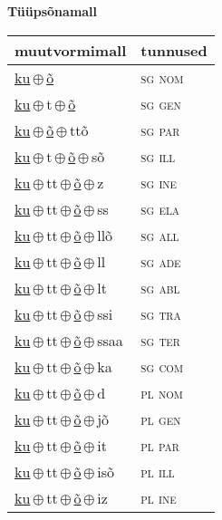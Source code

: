 

\vspace{3.5em}
\noindent \begin{minipage}{\textwidth}
\noindent \textbf{Tüüpsõnamall \,}\\

\begin{sideways}
\begin{tabular}{l l}
muutvormimall & tunnused \\
\hline
\underline{ku}\,$\oplus$\,\underline{õ} & \textsc{ sg nom } \\
\underline{ku}\,$\oplus$\,t\,$\oplus$\,\underline{õ} & \textsc{ sg gen } \\
\underline{ku}\,$\oplus$\,\underline{õ}\,$\oplus$\,ttõ & \textsc{ sg par } \\
\underline{ku}\,$\oplus$\,t\,$\oplus$\,\underline{õ}\,$\oplus$\,sõ & \textsc{ sg ill } \\
\underline{ku}\,$\oplus$\,tt\,$\oplus$\,\underline{õ}\,$\oplus$\,z & \textsc{ sg ine } \\
\underline{ku}\,$\oplus$\,tt\,$\oplus$\,\underline{õ}\,$\oplus$\,ss & \textsc{ sg ela } \\
\underline{ku}\,$\oplus$\,tt\,$\oplus$\,\underline{õ}\,$\oplus$\,llõ & \textsc{ sg all } \\
\underline{ku}\,$\oplus$\,tt\,$\oplus$\,\underline{õ}\,$\oplus$\,ll & \textsc{ sg ade } \\
\underline{ku}\,$\oplus$\,tt\,$\oplus$\,\underline{õ}\,$\oplus$\,lt & \textsc{ sg abl } \\
\underline{ku}\,$\oplus$\,tt\,$\oplus$\,\underline{õ}\,$\oplus$\,ssi & \textsc{ sg tra } \\
\underline{ku}\,$\oplus$\,tt\,$\oplus$\,\underline{õ}\,$\oplus$\,ssaa & \textsc{ sg ter } \\
\underline{ku}\,$\oplus$\,tt\,$\oplus$\,\underline{õ}\,$\oplus$\,ka & \textsc{ sg com } \\
\underline{ku}\,$\oplus$\,tt\,$\oplus$\,\underline{õ}\,$\oplus$\,d & \textsc{ pl nom } \\
\underline{ku}\,$\oplus$\,tt\,$\oplus$\,\underline{õ}\,$\oplus$\,jõ & \textsc{ pl gen } \\
\underline{ku}\,$\oplus$\,tt\,$\oplus$\,\underline{õ}\,$\oplus$\,it & \textsc{ pl par } \\
\underline{ku}\,$\oplus$\,tt\,$\oplus$\,\underline{õ}\,$\oplus$\,isõ & \textsc{ pl ill } \\
\underline{ku}\,$\oplus$\,tt\,$\oplus$\,\underline{õ}\,$\oplus$\,iz & \textsc{ pl ine } \\

\end{tabular}
\end{sideways}
\end{minipage}
